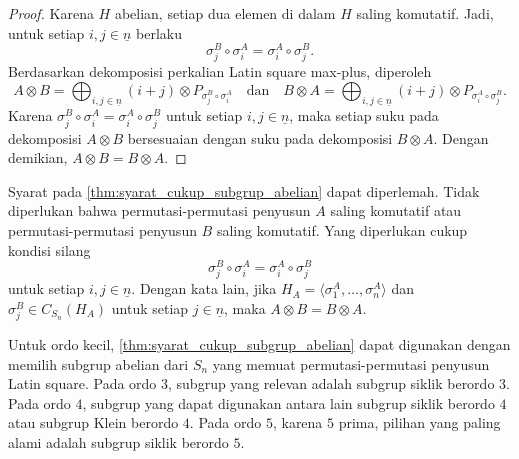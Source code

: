 \begin{proof}
  Karena $H$ abelian, setiap dua elemen di dalam $H$ saling komutatif. Jadi, untuk setiap $i,j\in \underline{n}$ berlaku
  \[
    \sigma_j^B\circ\sigma_i^A
    =
    \sigma_i^A\circ\sigma_j^B.
  \]
  Berdasarkan dekomposisi perkalian Latin square max-plus, diperoleh
  \[
    A\otimes B
    =
    \bigoplus_{i,j\in \underline{n}}
    (i+j)\otimes P_{\sigma_j^B\circ\sigma_i^A}
    \quad
    \text{dan}
    \quad
    B\otimes A
    =
    \bigoplus_{i,j\in \underline{n}}
    (i+j)\otimes P_{\sigma_i^A\circ\sigma_j^B}.
  \]
  Karena $\sigma_j^B\circ\sigma_i^A=\sigma_i^A\circ\sigma_j^B$ untuk setiap $i,j\in \underline{n}$, maka setiap suku pada dekomposisi $A\otimes B$ bersesuaian dengan suku pada dekomposisi $B\otimes A$. Dengan demikian, $A\otimes B=B\otimes A$.
\end{proof}

Syarat pada \autoref{thm:syarat_cukup_subgrup_abelian} dapat diperlemah.
Tidak diperlukan bahwa permutasi-permutasi penyusun $A$ saling komutatif
atau permutasi-permutasi penyusun $B$ saling komutatif. Yang diperlukan
cukup kondisi silang
\[
  \sigma_j^B\circ\sigma_i^A
  =
  \sigma_i^A\circ\sigma_j^B
\]
untuk setiap $i,j\in \underline{n}$. Dengan kata lain, jika
$H_A=\langle \sigma_1^A,\ldots,\sigma_n^A\rangle$ dan
$\sigma_j^B\in C_{S_n}(H_A)$ untuk setiap $j\in \underline{n}$, maka
$A\otimes B=B\otimes A$.

Untuk ordo kecil, \autoref{thm:syarat_cukup_subgrup_abelian} dapat
digunakan dengan memilih subgrup abelian dari $S_n$ yang memuat
permutasi-permutasi penyusun Latin square. Pada ordo $3$, subgrup yang
relevan adalah subgrup siklik berordo $3$. Pada ordo $4$, subgrup yang
dapat digunakan antara lain subgrup siklik berordo $4$ atau subgrup Klein
berordo $4$. Pada ordo $5$, karena $5$ prima, pilihan yang paling alami
adalah subgrup siklik berordo $5$.

